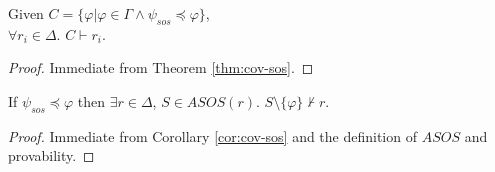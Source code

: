 \begin{coroll}
\label{cor:cov-sos}
Given $C = \{\varphi | \varphi \in \Gamma \wedge  \psi_{sos} \preccurlyeq \varphi \}$, \\
$\forall r_i \in \Delta$. $C \vdash r_i$.
\end{coroll}
\begin{proof}
Immediate from Theorem \ref{thm:cov-sos}.
\end{proof}
\vspace{2mm}

\begin{theorem}
\label{thm:sos-r}
If $\psi_{sos} \preccurlyeq \varphi$ then $\exists r \in \Delta$, $S \in ASOS(r)$.
$S \setminus \{\varphi \} \nvdash r$.
\end{theorem}
\begin{proof}
Immediate from Corollary \ref{cor:cov-sos} and the definition of $ASOS$ and provability.
\end{proof}
\vspace{2mm}

